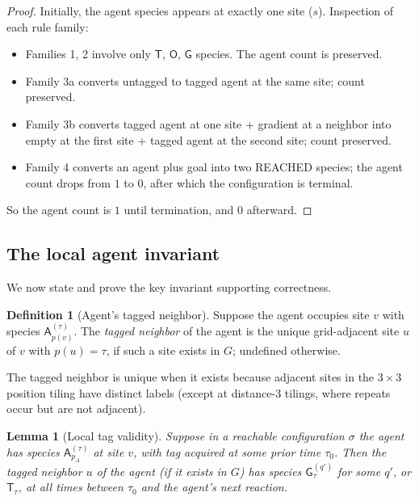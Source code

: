 \documentclass[11pt]{article}
\theoremstyle{plain}
\newtheorem{lemma}[theorem]{Lemma}
\theoremstyle{definition}
\newtheorem{definition}[theorem]{Definition}
\theoremstyle{remark}
\begin{document}
\begin{proof}
Initially, the agent species appears at exactly one site ($s$). Inspection of each rule family:
\begin{itemize}
    \item Families 1, 2 involve only $\mathsf{T}$, $\mathsf{O}$, $\mathsf{G}$ species. The agent count is preserved.
    \item Family 3a converts untagged to tagged agent at the same site; count preserved.
    \item Family 3b converts tagged agent at one site + gradient at a neighbor into empty at the first site + tagged agent at the second site; count preserved.
    \item Family 4 converts an agent plus goal into two REACHED species; the agent count drops from $1$ to $0$, after which the configuration is terminal.
\end{itemize}
So the agent count is $1$ until termination, and $0$ afterward.
\end{proof}

\subsection{The local agent invariant}

We now state and prove the key invariant supporting correctness.

\begin{definition}[Agent's tagged neighbor]
\label{def:tagged-neighbor}
Suppose the agent occupies site $v$ with species $\mathsf{A}^{(\tau)}_{p(v)}$. The \emph{tagged neighbor} of the agent is the unique grid-adjacent site $u$ of $v$ with $p(u) = \tau$, if such a site exists in $G$; undefined otherwise.
\end{definition}

The tagged neighbor is unique when it exists because adjacent sites in the $3 \times 3$ position tiling have distinct labels (except at distance-$3$ tilings, where repeats occur but are not adjacent).

\begin{lemma}[Local tag validity]
\label{lem:tag-validity}
Suppose in a reachable configuration $\sigma$ the agent has species $\mathsf{A}^{(\tau)}_{p_A}$ at site $v$, with tag acquired at some prior time $\tau_0$. Then the tagged neighbor $u$ of the agent (if it exists in $G$) has species $\mathsf{G}^{(q')}_\tau$ for some $q'$, or $\mathsf{T}_\tau$, at all times between $\tau_0$ and the agent's next reaction.
\end{lemma}
\end{document}
